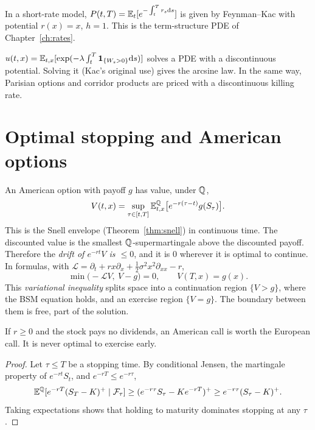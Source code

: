 \begin{example}
In a short-rate model, $P(t,T)=\mathbb{E}_t[e^{-\int_t^Tr_s\mathrm{d} s}]$ is given by Feynman--Kac with potential $r(x)=x$, $h=1$. This is the term-structure PDE of Chapter~\ref{ch:rates}.
\end{example}

\begin{example}
$u(t,x)=\mathbb{E}_{t,x}[\exp(-\lambda\int_t^T\mathbf{1}_{\{W_s>0\}}\mathrm{d} s)]$ solves a PDE with a discontinuous potential. Solving it (Kac's original use) gives the arcsine law. In the same way, Parisian options and corridor products are priced with a discontinuous killing rate.
\end{example}

\section{Optimal stopping and American options}\label{sec:american}

An American option with payoff $g$ has value, under $\mathbb{Q}$,
\[
V(t,x)=\sup_{\tau\in[t,T]}\mathbb{E}^{\mathbb{Q}}_{t,x}\bigl[e^{-r(\tau-t)}g(S_\tau)\bigr].
\]
This is the Snell envelope (Theorem~\ref{thm:snell}) in continuous time. The discounted value is the smallest $\mathbb{Q}$-supermartingale above the discounted payoff. Therefore the \emph{drift of $e^{-rt}V$ is $\le0$}, and it is $0$ wherever it is optimal to continue. In formulas, with $\mathcal{L}=\partial_t+rx\partial_x+\tfrac12\sigma^2x^2\partial_{xx}-r$,
\begin{equation}\label{eq:vi}
\min\bigl(-\mathcal{L}V,\ V-g\bigr)=0,\qquad V(T,x)=g(x).
\end{equation}
This \emph{variational inequality} splits space into a continuation region $\{V>g\}$, where the BSM equation holds, and an exercise region $\{V=g\}$. The boundary between them is free, part of the solution.

\begin{theorem}
If $r\ge0$ and the stock pays no dividends, an American call is worth the European call. It is never optimal to exercise early.
\end{theorem}
\begin{proof}
Let $\tau\le T$ be a stopping time. By conditional Jensen, the martingale property of $e^{-rt}S_t$, and $e^{-rT}\le e^{-r\tau}$,
\[
\mathbb{E}^{\mathbb{Q}}[e^{-rT}(S_T-K)^+\mid\mathcal{F}_\tau]\ge(e^{-r\tau}S_\tau-Ke^{-rT})^+\ge e^{-r\tau}(S_\tau-K)^+.
\]
Taking expectations shows that holding to maturity dominates stopping at any $\tau$.
\end{proof}

